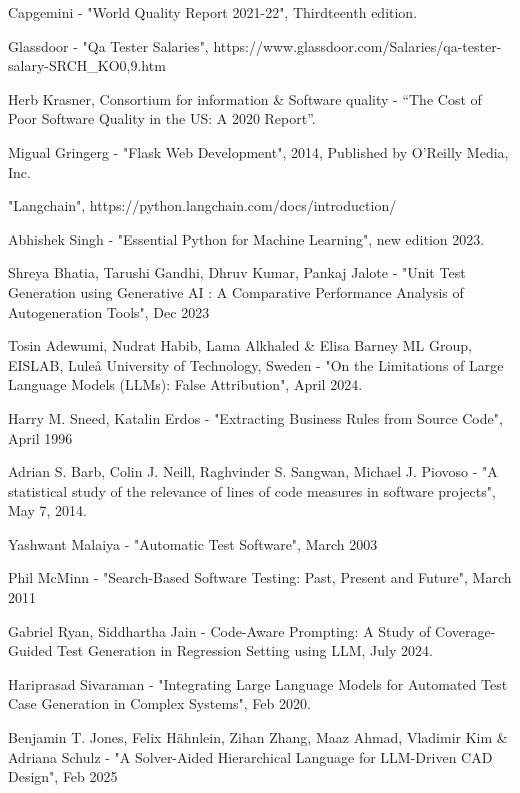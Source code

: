 \documentclass[12pt, twoside]{report}
\begin{document}
\begin{thebibliography}{99}
Capgemini - "World Quality Report 2021-22", Thirdteenth edition.

Glassdoor - "Qa Tester Salaries", https://www.glassdoor.com/Salaries/qa-tester-salary-SRCH\_KO0,9.htm 

Herb Krasner, Consortium for information \& Software quality - ``The Cost of Poor Software Quality in the US: A 2020 Report''.

Migual Gringerg - "Flask Web Development", 2014, Published by O'Reilly Media, Inc.

"Langchain", https://python.langchain.com/docs/introduction/ 

Abhishek Singh - "Essential Python for Machine Learning", new edition 2023.

Shreya Bhatia, Tarushi Gandhi, Dhruv Kumar, Pankaj Jalote - "Unit Test Generation using Generative AI : A Comparative Performance Analysis of Autogeneration Tools", Dec 2023

Tosin Adewumi, Nudrat Habib, Lama Alkhaled \& Elisa Barney ML Group, EISLAB, Luleå University of Technology, Sweden - "On the Limitations of Large Language Models (LLMs): False Attribution", April 2024.

Harry M. Sneed, Katalin Erdos - "Extracting Business Rules from Source Code", April 1996

Adrian S. Barb, Colin J. Neill, Raghvinder S. Sangwan, Michael J. Piovoso - "A statistical study of the relevance of lines of code measures in software projects", May 7, 2014.

Yashwant Malaiya - "Automatic Test Software", March 2003

Phil McMinn - "Search-Based Software Testing: Past, Present and Future", March 2011

Gabriel Ryan, Siddhartha Jain - Code-Aware Prompting: A Study of Coverage-Guided Test Generation in Regression Setting using LLM, July 2024.

Hariprasad Sivaraman - "Integrating Large Language Models for Automated Test Case Generation in Complex Systems", Feb 2020.

Benjamin T. Jones, Felix Hähnlein, Zihan Zhang, Maaz Ahmad, Vladimir Kim \& Adriana Schulz - "A Solver-Aided Hierarchical Language for LLM-Driven CAD Design", Feb 2025


\end{thebibliography}
\end{document}
